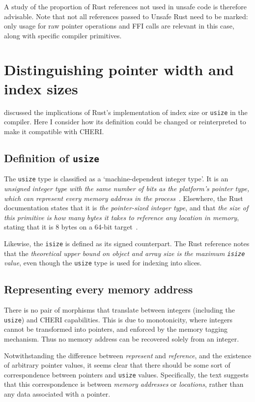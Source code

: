 \documentclass[dissertation.tex]{subfiles}
\begin{document}
A study of the proportion of Rust references not used in unsafe code is
therefore advisable.
Note that not all references passed to Unsafe Rust need to be marked:
only usage for raw pointer operations and FFI calls are relevant in this
case, along with specific compiler primitives.


\section{Distinguishing pointer width and index sizes}
\label{sec:eval-usize}

 discussed the implications of
Rust's implementation of index size or \texttt{usize} in the compiler.
Here I consider how its definition could be changed or reinterpreted to
make it compatible with CHERI.

\subsection{Definition of \texttt{usize}}
The \texttt{usize} type is classified as a `machine-dependent integer
type'.
It is an \emph{unsigned integer type with the same number of bits as the
platform's pointer type, which can represent every memory address in the
process}~\cite{rust-ref}.
Elsewhere, the Rust documentation states that it is \emph{the
pointer-sized integer type}, and that \emph{the size of this primitive
is how many bytes it takes to reference any location in memory}, stating
that it is 8 bytes on a 64-bit target~\cite{rust-std-primitive-usize}.

Likewise, the \texttt{isize} is defined as its signed counterpart.
The Rust reference notes that the \emph{theoretical upper bound on
object and array size is the maximum \texttt{isize} value}, even though
the \texttt{usize} type is used for indexing into slices.

\subsection{Representing every memory address}
There is no pair of morphisms that translate between integers (including
the \texttt{usize}) and CHERI capabilities.
This is due to monotonicity, where integers cannot be transformed into
pointers, and enforced by the memory tagging mechanism.
Thus no memory address can be recovered solely from an integer.

Notwithstanding the difference between \emph{represent} and
\emph{reference}, and the existence of arbitrary pointer values, it
seems clear that there should be some sort of correspondence between
pointers and \texttt{usize} values.
Specifically, the text suggests that this correspondence is between
\emph{memory addresses} or \emph{locations}, rather than any data
associated with a pointer.
\end{document}
